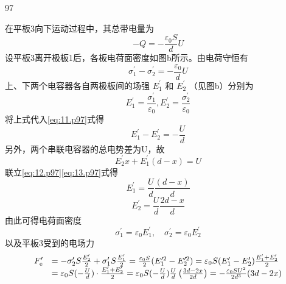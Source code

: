 \begin{solution}{97}
\begin{subsolution}
        在平板3向下运动过程中，其总带电量为
        \begin{equation*}
            - Q = - \frac {\varepsilon_ {0} S}{d} U
        \end{equation*}
        设平板3离开极板1后，各板电荷面密度如图b所示。由电荷守恒有
        \begin{equation}
            \sigma_ {1} ^ {\prime} - \sigma_ {2} ^ {\prime} = - \frac {\varepsilon_ {0}}{d} U
            \label{eq:11.p97}
        \end{equation}
        上、下两个电容器各自两极板间的场强 $E_{1}^{\prime}$ 和 $E_{2}^{\prime}$ （见图b）分别为
        \begin{equation*}
            E _ {1} ^ {\prime} = \frac {\sigma_ {1} ^ {\prime}}{\varepsilon_ {0}}, E _ {2} ^ {\prime} = \frac {\sigma_ {2} ^ {\prime}}{\varepsilon_ {0}}
        \end{equation*}
        将上式代入\eqref{eq:11.p97}式得
        \begin{equation}
            E _ {1} ^ {\prime} - E _ {2} ^ {\prime} = - \frac {U}{d}
            \label{eq:12.p97}
        \end{equation}
        另外，两个串联电容器的总电势差为U，故
        \begin{equation}
            E _ {2} ^ {\prime} x + E _ {1} ^ {\prime} (d - x) = U
            \label{eq:13.p97}
        \end{equation}
        联立\eqref{eq:12.p97}\eqref{eq:13.p97}式得
        \begin{equation}
            E _ {1} ^ {\prime} = \frac {U}{d} \frac {(d - x)}{d}
            \label{eq:14.p97}
        \end{equation}
        \begin{equation}
            E _ {2} ^ {\prime} = \frac {U}{d} \frac {2 d - x}{d}
            \label{eq:15.p97}
        \end{equation}
        由此可得电荷面密度
        \begin{equation*}
            \sigma_ {1} ^ {\prime} = \varepsilon_ {0} E _ {1} ^ {\prime}, \quad \sigma_ {2} ^ {\prime} = \varepsilon_ {0} E _ {2} ^ {\prime}
        \end{equation*}
        以及平板3受到的电场力
        \begin{equation}
            \begin{array}{r l} F _ {\mathrm{e}} ^ {\prime} & = - \sigma_ {2} ^ {\prime} S \frac {E _ {2} ^ {\prime}}{2} + \sigma_ {1} ^ {\prime} S \frac {E _ {1} ^ {\prime}}{2} = \frac {\varepsilon_ {0} S}{2} (E _ {1} ^ {\prime 2} - E _ {2} ^ {\prime 2}) = \varepsilon_ {0} S (E _ {1} ^ {\prime} - E _ {2} ^ {\prime}) \frac {E _ {1} ^ {\prime} + E _ {2} ^ {\prime}}{2} \\ & = \varepsilon_ {0} S (- \frac {U}{d}) \cdot \frac {E _ {1} ^ {\prime} + E _ {2} ^ {\prime}}{2} = \varepsilon_ {0} S (- \frac {U}{d}) \frac {U}{d} \left(\frac {3 d - 2 x}{2 d}\right) = - \frac {\varepsilon_ {0} S U ^ {2}}{2 d ^ {3}} (3 d - 2 x) \end{array}

\end{equation}
\end{subsolution}
\end{solution}
